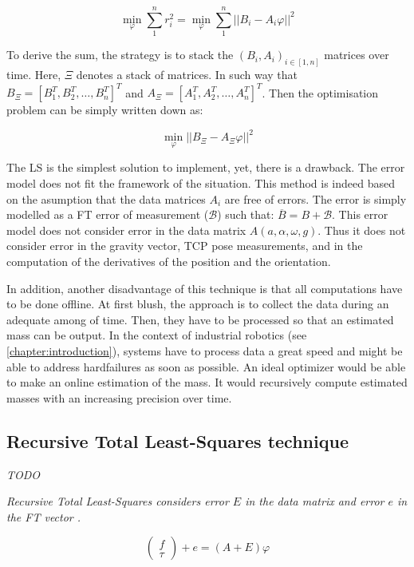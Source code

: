 \documentclass[/home/francois/latex/report/main.tex]{subfiles}
\begin{document}
\begin{equation}
  \min_{\varphi} \sum_{1}^{n} r_i^2 = \min_{\varphi} \sum_{1}^{n} ||B_i - A_i \varphi||^2
\end{equation}

To derive the sum, the strategy is to stack the $(B_i, A_i)_{i \in [1, n]}$ matrices over time. Here, $\Xi$ denotes a stack of matrices. In such way that $B_\Xi = [B_1^T, B_2^T, \ldots, B_n^T]^T$ and $A_\Xi = [A_1^T, A_2^T, \ldots, A_n^T]^T$. Then the optimisation problem can be simply written down as:

\begin{equation}
  \min_{\varphi} ||B_\Xi - A_\Xi \varphi||^2
\end{equation}

The \ac{LS} is the simplest solution to implement, yet, there is a drawback. The error model does not fit the framework of the situation. This method is indeed based on the asumption that the data matrices $A_i$ are free of errors. The error is simply modelled as a \ac{FT} error of measurement ($\mathcal{B}$) such that: $\overline{B} = B + \mathcal{B}$. This error model does not consider error in the data matrix $A(a, \alpha, \omega, g)$. Thus it does not consider error in the gravity vector, \ac{TCP} pose measurements, and in the computation of the derivatives of the position and the orientation.

In addition, another disadvantage of this technique is that all computations have to be done offline. At first blush, the approach is to collect the data during an adequate among of time. Then, they have to be processed so that an estimated mass can be output. In the context of industrial robotics (see \ref{chapter:introduction}), systems have to process data a great speed and might be able to address hardfailures as soon as possible. An ideal optimizer would be able to make an online estimation of the mass. It would recursively compute estimated masses with an increasing precision over time.

\subsection{Recursive Total Least-Squares technique}

\textit{TODO}

{\it
Recursive Total Least-Squares considers error $E$ in the data matrix and error $e$ in the \ac{FT} vector \cite{Kubus2008}
.

\begin{equation}
 \begin{pmatrix}
  f    \\
  \tau
 \end{pmatrix} + e
 = (A + E) \varphi
\end{equation}
}
\end{document}
